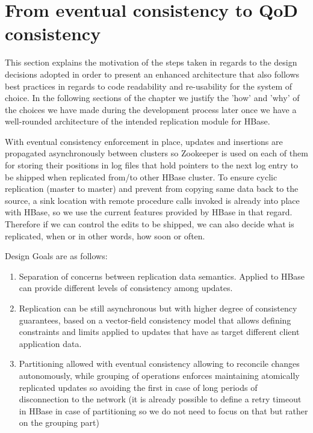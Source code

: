 
\section{From eventual consistency to QoD consistency}\label{architecture:requirements}
This section explains the motivation of the steps taken in regards to the design decisions adopted in order to present an enhanced architecture that also follows best practices in regards to code readability and re-usability for the system of choice. In the following sections of the chapter we justify the 'how' and 'why' of the choices we have made during the development process later once we have a well-rounded architecture of the intended replication module for HBase.

With eventual consistency enforcement in place, updates and insertions are propagated asynchronously between clusters so Zookeeper is used on each of them for storing their positions in log files that hold pointers to the next log entry to be shipped when replicated from/to other HBase cluster. To ensure cyclic replication (master to master) and prevent from copying same data back to the source, a sink location with remote procedure calls invoked is already into place with HBase, so we use the current features provided by HBase in that regard. Therefore if we can control the edits to be shipped, we can also decide what is replicated, when or in other words, how soon or often.

Design Goals are as follows:

\begin{enumerate}
\item Separation of concerns between replication data semantics. Applied to HBase can provide different levels of consistency among updates.
\item Replication can be still asynchronous but with higher degree of consistency guarantees, based on a vector-field consistency model that allows defining constraints and limits applied to updates that have as target different client application data.
\item Partitioning allowed with eventual consistency allowing to reconcile changes autonomously, while grouping of operations enforces maintaining atomically replicated updates so avoiding the first in case of long periods of disconnection to the network (it is already possible to define a retry timeout in HBase in case of partitioning so we do not need to focus on that but rather on the grouping part)
\end{enumerate}

